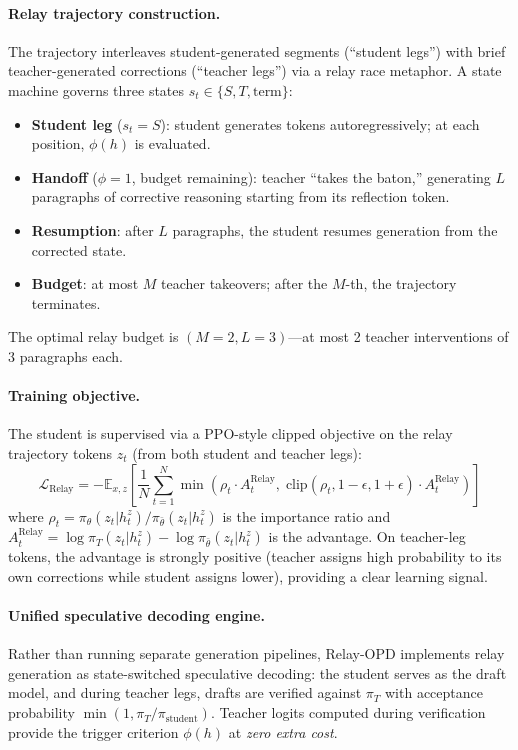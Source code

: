 \documentclass[11pt,a4paper]{article}
\begin{document}
\paragraph{Relay trajectory construction.}
The trajectory interleaves student-generated segments (``student legs'') with brief teacher-generated corrections (``teacher legs'') via a relay race metaphor. A state machine governs three states $s_t \in \{S, T, \text{term}\}$:
\begin{itemize}
    \item \textbf{Student leg} ($s_t = S$): student generates tokens autoregressively; at each position, $\phi(h)$ is evaluated.
    \item \textbf{Handoff} ($\phi = 1$, budget remaining): teacher ``takes the baton,'' generating $L$ paragraphs of corrective reasoning starting from its reflection token.
    \item \textbf{Resumption}: after $L$ paragraphs, the student resumes generation from the corrected state.
    \item \textbf{Budget}: at most $M$ teacher takeovers; after the $M$-th, the trajectory terminates.
\end{itemize}
The optimal relay budget is $(M=2, L=3)$---at most 2 teacher interventions of 3 paragraphs each.

\paragraph{Training objective.}
The student is supervised via a PPO-style clipped objective on the relay trajectory tokens $z_t$ (from both student and teacher legs):
\begin{equation}
    \mathcal{L}_{\text{Relay}} = -\mathbb{E}_{x,z}\left[\frac{1}{N}\sum_{t=1}^{N} \min\!\left(\rho_t \cdot A_t^{\text{Relay}},\; \text{clip}(\rho_t, 1{-}\epsilon, 1{+}\epsilon) \cdot A_t^{\text{Relay}}\right)\right]
\end{equation}
where $\rho_t = \pi_\theta(z_t|h_t^z)/\pi_{\bar{\theta}}(z_t|h_t^z)$ is the importance ratio and $A_t^{\text{Relay}} = \log \pi_T(z_t|h_t^z) - \log \pi_{\bar{\theta}}(z_t|h_t^z)$ is the advantage. On teacher-leg tokens, the advantage is strongly positive (teacher assigns high probability to its own corrections while student assigns lower), providing a clear learning signal.

\paragraph{Unified speculative decoding engine.}
Rather than running separate generation pipelines, Relay-OPD implements relay generation as state-switched speculative decoding: the student serves as the draft model, and during teacher legs, drafts are verified against $\pi_T$ with acceptance probability $\min(1, \pi_T/\pi_{\text{student}})$. Teacher logits computed during verification provide the trigger criterion $\phi(h)$ at \emph{zero extra cost}.
\end{document}
